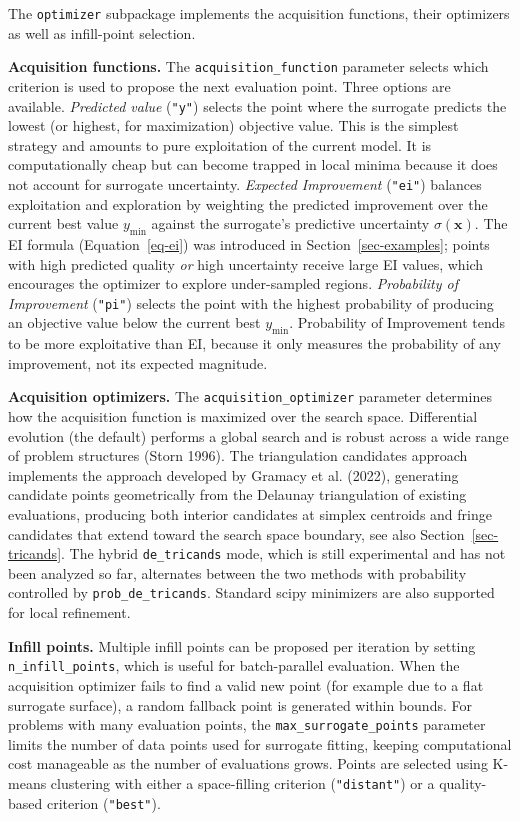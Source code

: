 \documentclass[
  twocolumn]{article}
\begin{document}
The \texttt{optimizer} subpackage implements the acquisition functions,
their optimizers as well as infill-point selection.

\textbf{Acquisition functions.} The \texttt{acquisition\_function}
parameter selects which criterion is used to propose the next evaluation
point. Three options are available. \emph{Predicted value}
(\texttt{"y"}) selects the point where the surrogate predicts the lowest
(or highest, for maximization) objective value. This is the simplest
strategy and amounts to pure exploitation of the current model. It is
computationally cheap but can become trapped in local minima because it
does not account for surrogate uncertainty. \emph{Expected Improvement}
(\texttt{"ei"}) balances exploitation and exploration by weighting the
predicted improvement over the current best value \(y_{\min}\) against
the surrogate's predictive uncertainty \(\sigma(\mathbf{x})\). The EI
formula (Equation~\ref{eq-ei}) was introduced in
Section~\ref{sec-examples}; points with high predicted quality \emph{or}
high uncertainty receive large EI values, which encourages the optimizer
to explore under-sampled regions. \emph{Probability of Improvement}
(\texttt{"pi"}) selects the point with the highest probability of
producing an objective value below the current best \(y_{\min}\).
Probability of Improvement tends to be more exploitative than EI,
because it only measures the probability of any improvement, not its
expected magnitude.

\textbf{Acquisition optimizers.} The \texttt{acquisition\_optimizer}
parameter determines how the acquisition function is maximized over the
search space. Differential evolution (the default) performs a global
search and is robust across a wide range of problem structures (Storn
1996). The triangulation candidates approach implements the approach
developed by Gramacy et al. (2022), generating candidate points
geometrically from the Delaunay triangulation of existing evaluations,
producing both interior candidates at simplex centroids and fringe
candidates that extend toward the search space boundary, see also
Section~\ref{sec-tricands}. The hybrid \texttt{de\_tricands} mode, which
is still experimental and has not been analyzed so far, alternates
between the two methods with probability controlled by
\texttt{prob\_de\_tricands}. Standard scipy minimizers are also
supported for local refinement.

\textbf{Infill points.} Multiple infill points can be proposed per
iteration by setting \texttt{n\_infill\_points}, which is useful for
batch-parallel evaluation. When the acquisition optimizer fails to find
a valid new point (for example due to a flat surrogate surface), a
random fallback point is generated within bounds. For problems with many
evaluation points, the \texttt{max\_surrogate\_points} parameter limits
the number of data points used for surrogate fitting, keeping
computational cost manageable as the number of evaluations grows. Points
are selected using K-means clustering with either a space-filling
criterion (\texttt{"distant"}) or a quality-based criterion
(\texttt{"best"}).
\end{document}
